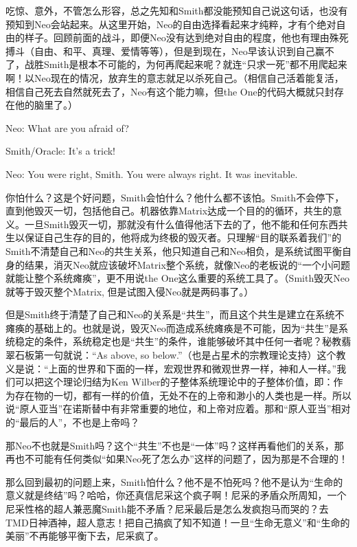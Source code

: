 \documentclass[UTF8]{ctexart}
\newenvironment{myquote}{\color{green} \setlength{\leftskip}{6em} \setlength{\rightskip}{4em} \setlength{\parindent}{-2em}}{\par}
\begin{document}
吃惊、意外，不管怎么形容，总之先知和Smith都没能预知自己说这句话，也没有预知到Neo会站起来。从这里开始，Neo的自由选择看起来才纯粹，才有个绝对自由的样子。回顾前面的战斗，即便Neo没有达到绝对自由的程度，他也有理由殊死搏斗（自由、和平、真理、爱情等等），但是到现在，Neo早该认识到自己赢不了，战胜Smith是根本不可能的，为何再爬起来呢？就连“只求一死”都不用爬起来啊！以Neo现在的情况，放弃生的意志就足以杀死自己。（相信自己活着能复活，相信自己死去自然就死去了，Neo有这个能力嘛，但the One的代码大概就只封存在他的脑里了。）

\begin{myquote}
Neo: What are you afraid of?

Smith/Oracle: It's a trick!

Neo: You were right, Smith. You were always right. It was inevitable.
\end{myquote}

你怕什么？这是个好问题，Smith会怕什么？他什么都不该怕。Smith不会停下，直到他毁灭一切，包括他自己。机器依靠Matrix达成一个目的的循环，共生的意义。一旦Smith毁灭一切，那就没有什么值得他活下去的了，他不能和任何东西共生以保证自己生存的目的，他将成为终极的毁灭者。只理解“目的联系着我们”的Smith不清楚自己和Neo的共生关系，他只知道自己和Neo相负，是系统试图平衡自身的结果，消灭Neo就应该破坏Matrix整个系统，就像Neo的老板说的“一个小问题就能让整个系统瘫痪”，更不用说the One这么重要的系统工具了。（Smith毁灭Neo就等于毁灭整个Matrix, 但是试图入侵Neo就是两码事了。）

但是Smith终于清楚了自己和Neo的关系是“共生”，而且这个共生是建立在系统不瘫痪的基础上的。也就是说，毁灭Neo而造成系统瘫痪是不可能，因为“共生”是系统稳定的条件，系统稳定也是“共生”的条件，谁能够破坏其中任何一者呢？秘教翡翠石板第一句就说：“As above, so below.”（也是占星术的宗教理论支持）这个教义是说：“上面的世界和下面的一样，宏观世界和微观世界一样，神和人一样。”我们可以把这个理论归结为Ken Wilber的子整体系统理论中的子整体价值，即：作为存在物的一切，都有一样的价值，无处不在的上帝和渺小的人类也是一样。所以说“原人亚当”在诺斯替中有非常重要的地位，和上帝对应着。那和“原人亚当”相对的“最后的人”，不也是上帝吗？

那Neo不也就是Smith吗？这个“共生”不也是“一体”吗？这样再看他们的关系，那再也不可能有任何类似“如果Neo死了怎么办”这样的问题了，因为那是不合理的！

那么回到最初的问题上来，Smith怕什么？他不是不怕死吗？他不是认为“生命的意义就是终结”吗？哈哈，你还真信尼采这个疯子啊！尼采的矛盾众所周知，一个尼采性格的超人兼恶魔Smith能不矛盾？尼采最后是怎么发疯抱马而哭的？去TMD日神酒神，超人意志！把自己搞疯了知不知道！一旦“生命无意义”和“生命的美丽”不再能够平衡下去，尼采疯了。
\end{document}
